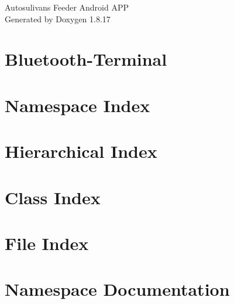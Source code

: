 \let\mypdfximage\pdfximage\def\pdfximage{\immediate\mypdfximage}\documentclass[twoside]{book}
\newcommand{\+}{\discretionary{\mbox{\scriptsize$\hookleftarrow$}}{}{}}
\newcommand{\clearemptydoublepage}{%
  \newpage{\pagestyle{empty}\cleardoublepage}%
}
\begin{document}
\hypersetup{pageanchor=false,
             bookmarksnumbered=true,
             pdfencoding=unicode
            }
\begin{titlepage}
\vspace*{7cm}
\begin{center}%
{\Large Autosulivan\textquotesingle{}s Feeder Android A\+PP }\\
\vspace*{1cm}
{\large Generated by Doxygen 1.8.17}\\
\end{center}
\end{titlepage}
\clearemptydoublepage
{}
\tableofcontents
\clearemptydoublepage
{}
\hypersetup{pageanchor=true}

\chapter{Bluetooth-\/\+Terminal}
\label{md__e_1__t_f_g_app_android_autosulivans_feeder_app__r_e_a_d_m_e}

\chapter{Namespace Index}

\chapter{Hierarchical Index}

\chapter{Class Index}

\chapter{File Index}

\chapter{Namespace Documentation}

















\end{document}

